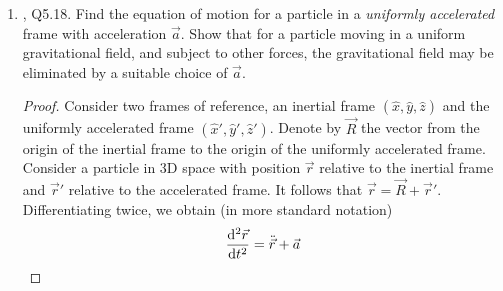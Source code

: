 \documentclass[../psets.tex]{subfiles}
\begin{document}
\begin{enumerate}
\begin{proof}
\begin{align*}
            t &= \frac{2\dot{r}_{r,0}}{g}\\
            t &= \frac{2\dot{r}_0\sin\alpha}{g}
        \end{align*}
        It follows that the particle's easterly displacement under the Coriolis force is
        \begin{align*}
            \ddot{r}_e &= 2\omega\dot{r}_n\cos\theta-2\omega\dot{r}_r\sin\theta\\
            &= 2\omega[\dot{r}_{n,0}\cos\theta-(-gt+\dot{r}_{r,0})\sin\theta]\\
            &= 2\omega(gt\sin\theta+\dot{r}_{n,0}\cos\theta-\dot{r}_{r,0}\sin\theta)\\
            r_e &= \omega t^2\left( \frac{gt}{3}\sin\theta+\dot{r}_{n,0}\cos\theta-\dot{r}_{r,0}\sin\theta \right)\\
            &= \frac{4\omega\dot{r}_0^2\sin^2\alpha}{g^2}\left( \frac{2\dot{r}_0\sin\alpha}{3}\sin\theta-\dot{r}_0\cos\alpha\cos\theta-\dot{r}_0\sin\alpha\sin\theta \right)\\
            &= \frac{4\omega\dot{r}_0^3\sin^2\alpha}{g^2}\left[ \frac{2}{3}\sin\alpha\sin\theta-\cos(\theta-\alpha) \right]
        \end{align*}
        The desired result is thus
        \begin{equation*}
            \boxed{r_e(\theta_S)-r_e(\theta_N) = \SI{80.8}{\meter}}
        \end{equation*}
    \end{proof}
    \item \textcite{bib:KibbleBerkshire}, Q5.18. Find the equation of motion for a particle in a \emph{uniformly accelerated} frame with acceleration $\vec{a}$. Show that for a particle moving in a uniform gravitational field, and subject to other forces, the gravitational field may be eliminated by a suitable choice of $\vec{a}$.
    \begin{proof}
        Consider two frames of reference, an inertial frame $(\hat{x},\hat{y},\hat{z})$ and the uniformly accelerated frame $(\hat{x}',\hat{y}',\hat{z}')$. Denote by $\vec{R}$ the vector from the origin of the inertial frame to the origin of the uniformly accelerated frame. Consider a particle in 3D space with position $\vec{r}$ relative to the inertial frame and $\vec{r}'$ relative to the accelerated frame. It follows that $\vec{r}=\vec{R}+\vec{r}'$. Differentiating twice, we obtain (in more standard notation)
        \begin{equation*}
            \dv[2]{\vec{r}}{t} = \ddot{\vec{r}}+\vec{a}

\end{equation*}
\end{proof}
\end{enumerate}
\end{document}
